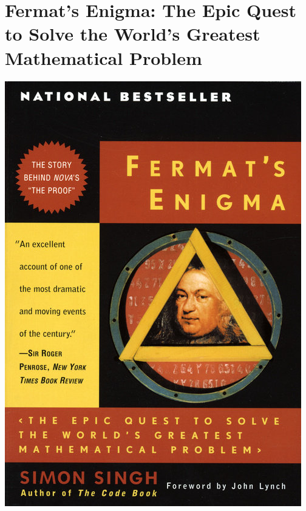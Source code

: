 \documentclass{tufte-handout}
\makeatletter
\newcommand{\varcaption}[2][0pt]{%
  \gsetlength{\@tufte@caption@vertical@offset}{-#1}%
  \gdef\@tufte@stored@varcaption{#2}%
}
\gdef\@tufte@stored@varcaption{} %
\makeatother
\begin{document}
\section*{Fermat's Enigma: The Epic Quest to Solve the World's \newline Greatest Mathematical Problem}
\begin{marginfigure}[\baselineskip]
   \includegraphics[width=\linewidth]{images/fermats_enigma.jpg}
   \varcaption{\href{https://www.penguinrandomhouse.com/books/168001/fermats-enigma-by-simon-singh-author-of-the-code-book-foreword-by-john-lynch/}{Publisher Link}, \href{https://www.amazon.com/Fermats-Enigma-Greatest-Mathematical-Problem/dp/0385493622/}{Amazon Link}}
\end{marginfigure}
\end{document}
